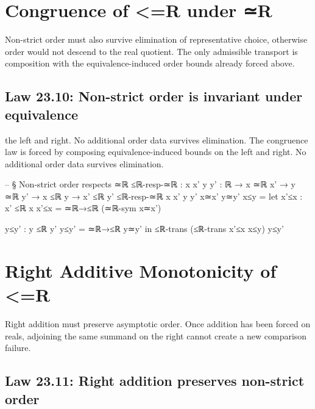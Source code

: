 \documentclass[11pt,a4paper]{book}
\def\mathbb#1{#1}%
\def\texorpdfstring#1#2{#2}%
\begin{document}
\section{Congruence of \texorpdfstring{$\le_{\mathbb{R}}$}{<=R} under \texorpdfstring{$\simeq_{\mathbb{R}}$}{≃R}}

Non-strict order must also survive elimination of representative choice, otherwise order would not descend to the real quotient. The only admissible transport is composition with the equivalence-induced order bounds already forced above.

\subsection*{Law 23.10: Non-strict order is invariant under equivalence}

the left and right. No additional order data survives elimination.
The congruence law is forced by composing equivalence-induced bounds on the left and right. No additional order data survives elimination.

\begin{code}
-- § Non-strict order respects ≃ℝ
≤ℝ-resp-≃ℝ : {x x' y y' : ℝ} → x ≃ℝ x' → y ≃ℝ y' → x ≤ℝ y → x' ≤ℝ y'
≤ℝ-resp-≃ℝ {x} {x'} {y} {y'} x≃x' y≃y' x≤y =
  let
    x'≤x : x' ≤ℝ x
    x'≤x = ≃ℝ→≤ℝ (≃ℝ-sym x≃x')

    y≤y' : y ≤ℝ y'
    y≤y' = ≃ℝ→≤ℝ y≃y'
  in
  ≤ℝ-trans (≤ℝ-trans x'≤x x≤y) y≤y'
\end{code}


\section{Right Additive Monotonicity of \texorpdfstring{$\le_{\mathbb{R}}$}{<=R}}

Right addition must preserve asymptotic order. Once addition has been forced on reals, adjoining the same summand on the right cannot create a new comparison failure.

\subsection*{Law 23.11: Right addition preserves non-strict order}
\end{document}
